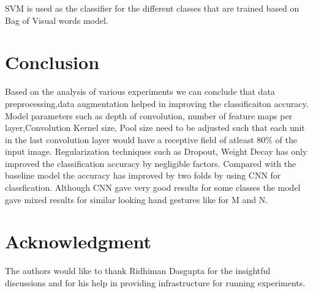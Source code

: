 \documentclass[conference]{IEEEtran}
\begin{document}
SVM is used as the classifier for the different classes that are trained based on Bag of Visual words model.



\section{Conclusion}
Based on the analysis of various experiments we can conclude that data preprocessing,data augmentation helped in improving the classificaiton accuracy. Model parameters such as depth of convolution, number of feature maps per layer,Convolution Kernel size, Pool size need to be adjusted such that each unit in the last convolution layer would have a receptive field of atleast $80\%$ of the input image. Regularization techniques such as Dropout, Weight Decay has only improved the classification accuracy by negligible factors. Compared with the baseline model the accuracy has improved by two folds by using CNN for classfication. Although CNN gave very good results for some classes the model gave mixed results for similar looking hand gestures like for M and N.



\section*{Acknowledgment}


The authors would like to thank Ridhiman Dasgupta for the insightful discussions and for his help in providing infrastructure for running experiments.






\end{document}
